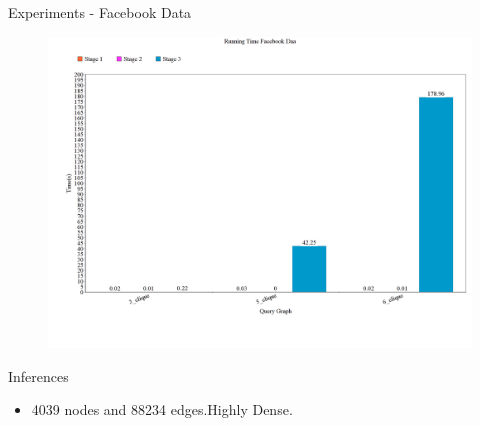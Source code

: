 \documentclass{beamer}
\begin{document}
\begin{frame}{Experiments - Facebook Data}
\begin{figure}[h]
 \centering
\includegraphics[width=.5\textwidth]{fb.png}

 \label{fig:dchange}
\end{figure}
\begin{block}{Inferences}
    \begin{itemize}
    \item 4039 nodes and 88234 edges.Highly Dense.
    \end{itemize}
\end{block}
\end{frame}
\end{document}
